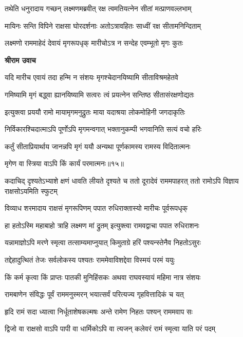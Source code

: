 \twolineshloka
{तथेति धनुरादाय गच्छन् लक्ष्मणमब्रवीत्}
{रक्ष त्वमतियत्नेन सीतां मत्प्राणवल्लभाम्} %

\twolineshloka
{मायिनः सन्ति विपिने राक्षसा घोरदर्शनाः}
{अतोऽत्रावहितः साध्वीं रक्ष सीतामनिन्दिताम्} %

\twolineshloka
{लक्ष्मणो राममाहेदं देवायं मृगरूपधृक्}
{मारीचोऽत्र न सन्देह एवम्भूतो मृगः कुतः} %

\textbf{श्रीराम उवाच}

\twolineshloka
{यदि मारीच एवायं तदा हन्मि न संशयः}
{मृगश्चेदानयिष्यामि सीताविश्रमहेतवे} %

\twolineshloka
{गमिष्यामि मृगं बद्ध्वा ह्यानयिष्यामि सत्वरः}
{त्वं प्रयत्नेन सन्तिष्ठ सीतासंरक्षणोद्यतः} %

\twolineshloka
{इत्युक्त्वा प्रययौ रामो मायामृगमनुद्रुतः}
{माया यदाश्रया लोकमोहिनी जगदाकृतिः} %

\twolineshloka
{निर्विकारश्चिदात्माऽपि पूर्णोऽपि मृगमन्वगात्}
{भक्तानुकम्पी भगवानिति सत्यं वचो हरिः} %

\twolineshloka
{कर्तुं सीताप्रियार्थाय जानन्नपि मृगं ययौ}
{अन्यथा पूर्णकामस्य रामस्य विदितात्मनः} %

{मृगेण वा स्त्रिया वाऽपि किं कार्यं परमात्मनः॥१५॥} %


\threelineshloka
{कदाचिद् दृश्यतेऽभ्याशे क्षणं धावति लीयते}
{दृश्यते च ततो दूरादेवं राममपाहरत्}
{ततो रामोऽपि विज्ञाय राक्षसोऽयमिति स्फुटम्} %

\twolineshloka
{विव्याध शरमादाय राक्षसं मृगरूपिणम्}
{पपात रुधिराक्तास्यो मारीचः पूर्वरूपधृक्} %

\twolineshloka
{हा हतोऽस्मि महाबाहो त्राहि लक्ष्मण मां द्रुतम्}
{इत्युक्त्वा रामवद्वाचा पपात रुधिराशनः} %

\twolineshloka
{यन्नामाज्ञोऽपि मरणे स्मृत्वा तत्साम्यमाप्नुयात्}
{किमुताग्रे हरिं पश्यन्स्तेनैव निहतोऽसुरः} %

\twolineshloka
{तद्देहादुत्थितं तेजः सर्वलोकस्य पश्यतः}
{राममेवाविशद्देवा विस्मयं परमं ययुः} %

\twolineshloka
{किं कर्म कृत्वा किं प्राप्तः पातकी मुनिहिंसकः}
{अथवा राघवस्यायं महिमा नात्र संशयः} %

\twolineshloka
{रामबाणेन संविद्धः पूर्वं राममनुस्मरन्}
{भयात्सर्वं परित्यज्य गृहवित्तादिकं च यत्} %

\twolineshloka
{हृदि रामं सदा ध्यात्वा निर्धूताशेषकल्मषः}
{अन्ते रामेण निहतः पश्यन् राममवाप सः} %

\twolineshloka
{द्विजो वा राक्षसो वाऽपि पापी वा धार्मिकोऽपि वा}
{त्यजन् कलेवरं रामं स्मृत्वा याति परं पदम्} %

